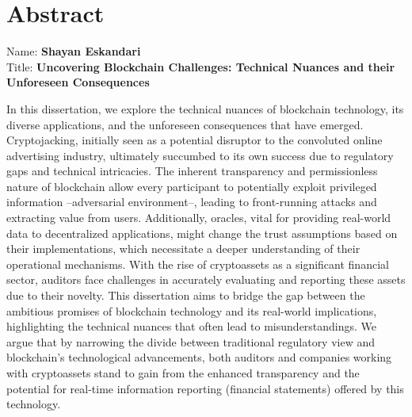 
\chapter*{Abstract}

Name: 	\tab \textbf{Shayan Eskandari} \\
Title: 	\tab \textbf{Uncovering Blockchain Challenges: Technical Nuances and their Unforeseen Consequences}

In this dissertation, we explore the technical nuances of blockchain technology, its diverse applications, and the unforeseen consequences that have emerged. Cryptojacking, initially seen as a potential disruptor to the convoluted online advertising industry, ultimately succumbed to its own success due to regulatory gaps and technical intricacies. The inherent transparency and permissionless nature of blockchain allow every participant to potentially exploit privileged information --adversarial environment--, leading to front-running attacks and extracting value from users. Additionally, oracles, vital for providing real-world data to decentralized applications, might change the trust assumptions based on their implementations, which necessitate a deeper understanding of their operational mechanisms. With the rise of cryptoassets as a significant financial sector, auditors face challenges in accurately evaluating and reporting these assets due to their novelty. This dissertation aims to bridge the gap between the ambitious promises of blockchain technology and its real-world implications, highlighting the technical nuances that often lead to misunderstandings. We argue that by narrowing the divide between traditional regulatory view and blockchain's technological advancements, both auditors and companies working with cryptoassets stand to gain from the enhanced transparency and the potential for real-time information reporting (\eg financial statements) offered by this technology.









